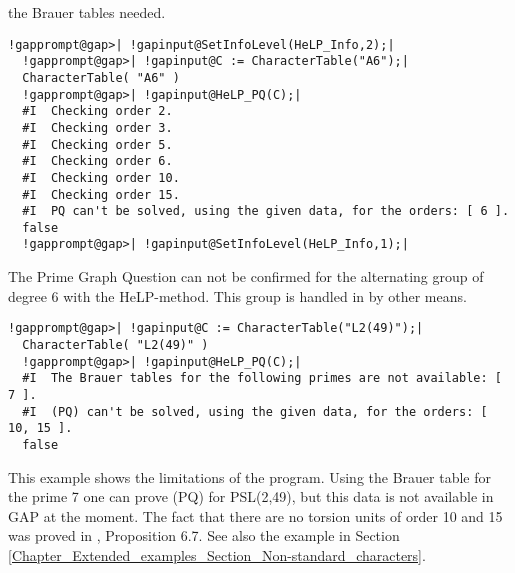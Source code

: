 \documentclass[a4paper,11pt]{report}
\begin{document}
{{the Brauer tables needed. 
\begin{Verbatim}[commandchars=!@|,fontsize=\small,frame=single,label=Example]
  !gapprompt@gap>| !gapinput@SetInfoLevel(HeLP_Info,2);|
  !gapprompt@gap>| !gapinput@C := CharacterTable("A6");|
  CharacterTable( "A6" )
  !gapprompt@gap>| !gapinput@HeLP_PQ(C);|
  #I  Checking order 2.
  #I  Checking order 3.
  #I  Checking order 5.
  #I  Checking order 6.
  #I  Checking order 10.
  #I  Checking order 15.
  #I  PQ can't be solved, using the given data, for the orders: [ 6 ].
  false
  !gapprompt@gap>| !gapinput@SetInfoLevel(HeLP_Info,1);|
\end{Verbatim}
 The Prime Graph Question can not be confirmed for the alternating group of
degree 6 with the HeLP-method. This group is handled in \cite{HerA6} by other means. 
\begin{Verbatim}[commandchars=!@|,fontsize=\small,frame=single,label=Example]
  !gapprompt@gap>| !gapinput@C := CharacterTable("L2(49)");|
  CharacterTable( "L2(49)" )
  !gapprompt@gap>| !gapinput@HeLP_PQ(C);|
  #I  The Brauer tables for the following primes are not available: [ 7 ].
  #I  (PQ) can't be solved, using the given data, for the orders: [ 10, 15 ].
  false
\end{Verbatim}
 This example shows the limitations of the program. Using the Brauer table for
the prime 7 one can prove (PQ) for PSL(2,49), but this data is not available
in GAP at the moment. The fact that there are no torsion units of order 10 and
15 was proved in \cite{HertweckBrauer}, Proposition 6.7. See also the example in Section \ref{Chapter_Extended_examples_Section_Non-standard_characters}. }

 }

   
\end{document}
